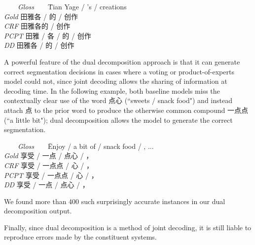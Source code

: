 \begin{footnotesize}
\begin{tabbing}
\ \ \ \ \= \emph{Gloss}\ \ \ \ \= Tian Yage / 's / creations \\
\> \emph{Gold} \>   田雅各 / 的 / 创作 \\
\> \emph{CRF} \>  田雅各的 / 创作 \\
\> \emph{PCPT} \>  田雅 / 各 / 的 / 创作 \\
\> \emph{DD} \>  田雅各 / 的 / 创作 \\
\end{tabbing}
\end{footnotesize}

A powerful feature of the dual decomposition approach is that it can generate correct segmentation decisions in cases where a voting or product-of-experts model could not, since joint decoding allows the sharing of information at decoding time. In the following example, both baseline models miss the contextually clear use of the word 点心 (``sweets / snack food") and instead attach 点 to the prior word to produce the otherwise common compound 一点点 (``a little bit"); dual decomposition allows the model to generate the correct segmentation.
\begin{footnotesize}
\begin{tabbing}
\ \ \ \ \= \emph{Gloss}\ \ \ \ \= Enjoy / a bit of / snack food / , ... \\
\> \emph{Gold} \>  享受 / 一点 / 点心 /  ，\\
\> \emph{CRF} \> 享受 / 一点点 / 心 / ，\\
\> \emph{PCPT} \> 享受 / 一点点 / 心 / ， \\
\> \emph{DD} \>  享受 / 一点 / 点心 / ，\\
\end{tabbing}
\end{footnotesize}\vspace{-3mm}
We found more than 400 such surprisingly accurate instances in our dual decomposition output.

Finally, since dual decomposition is a method of joint decoding, it is still liable to reproduce errors made by the constituent systems. 


